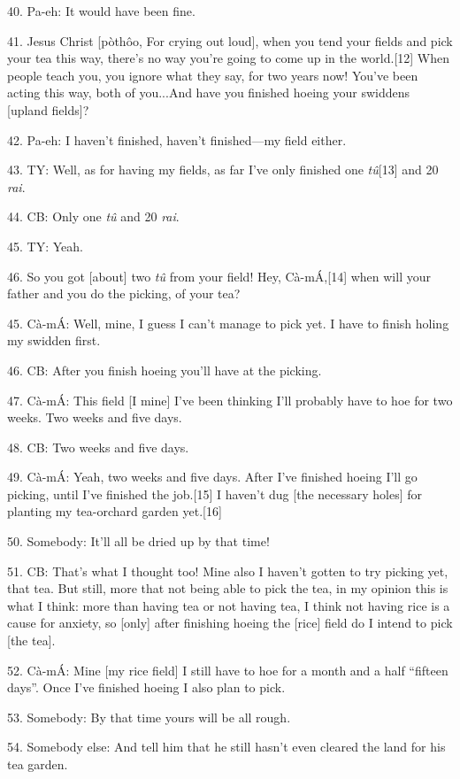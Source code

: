 40. Pa-eh: It would have been fine.

41. Jesus Christ [pòthôo, For crying out loud], when you tend your fields and
pick your tea this way, there's no way you're going to come up in the world.[12]
When people teach you, you ignore what they say, for two years now!  You've been
acting this way, both of you...And have you finished hoeing your swiddens [upland
fields]?

42. Pa-eh: I haven't finished, haven't finished---my field either.

43. TY: Well, as for having my fields, as far I've only finished one \textit{tû}[13]
and 20 \textit{rai}.

44. CB: Only one \textit{tû} and 20 \textit{rai}.

45. TY: Yeah.

46. So you got [about] two \textit{tû }from your field!  Hey, Cà-mÁ,[14] when
will your father and you do the picking, of your tea?

45. Cà-mÁ: Well, mine, I guess I can't manage to pick yet.  I have to finish
holing my swidden first.

46. CB: After you finish hoeing you'll have at the picking.

47. Cà-mÁ: This field [I mine] I've been thinking I'll probably have to hoe for
two weeks.  Two weeks and five days.

48. CB: Two weeks and five days.

49. Cà-mÁ: Yeah, two weeks and five days.  After I've finished hoeing I'll go
picking, until I've finished the job.[15]  I haven't dug [the necessary holes]
for planting my tea-orchard garden yet.[16]

50. Somebody: It'll all be dried up by that time!

51. CB: That's what I thought too!  Mine also I haven't gotten to try picking yet,
that tea.  But still, more that not being able to pick the tea, in my opinion this
is what I think: more than having tea or not having tea, I think not having rice
is a cause for anxiety, so [only] after finishing hoeing the [rice] field do I
intend to pick [the tea].

52. Cà-mÁ: Mine [my rice field] I still have to hoe for a month and a half ``fifteen
days''.  Once I've finished hoeing I also plan to pick.

53. Somebody: By that time yours will be all rough.

54. Somebody else: And tell him that he still hasn't even cleared the land for
his tea garden.

